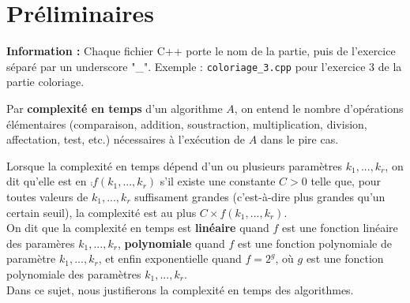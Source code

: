\section*{Préliminaires}

{\textbf{Information : }
\textcolor{universitycomp}{Chaque fichier C++ porte le nom de la partie, puis de l'exercice séparé par un underscore "\_". Exemple : \texttt{coloriage\_3.cpp} pour l'exercice 3 de la partie coloriage.}}

\begin{definition}[Complexité]
    Par \textbf{complexité en temps} d'un algorithme $A$, on entend le nombre d'opérations élémentaires (comparaison, addition, soustraction, multiplication, division, affectation, test, etc.) nécessaires à l'exécution de $A$ dans le pire cas.
\end{definition}
Lorsque la complexité en temps dépend d'un ou plusieurs paramètres $k_1,...,k_r$, on dit qu'elle est en $\comp{f(k_1,...,k_r)}$ s'il existe une constante $C>0$ telle que, pour toutes valeurs de $k_1,...,k_r$ suffisament grandes (c'est-à-dire plus grandes qu'un certain seuil), la complexité est au plus $C \times f(k_1,...,k_r)$.
\\
On dit que la complexité en temps est \textbf{linéaire} quand $f$ est une fonction linéaire des paramères $k_1,...,k_r$, \textbf{polynomiale}
quand $f$ est une fonction polynomiale de paramètre $k_1,...,k_r$, et enfin exponentielle quand $f = 2^g$, où $g$ est une fonction polynomiale des paramètres $k_1,...,k_r$.
\\
Dans ce sujet, nous justifierons la complexité en temps des algorithmes.

\begin{definition}[Graphe]
        
\end{definition}